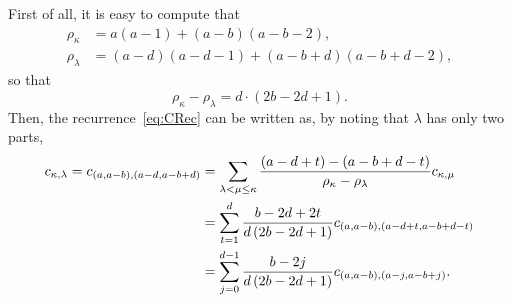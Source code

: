 \documentclass[10pt,oneside,american]{amsart}
\numberwithin{equation}{section}
\numberwithin{figure}{section}
\theoremstyle{plain}
\theoremstyle{definition}
\theoremstyle{remark}
\theoremstyle{plain}
\theoremstyle{definition}
\theoremstyle{plain}
\theoremstyle{plain}
\begin{document}
First of all, it is easy to compute that 
\begin{align*}
  \rho_{\kappa} &= a(a-1) + (a-b)(a-b-2), \\
  \rho_{\lambda} &= (a-d)(a-d-1) + (a-b+d)(a-b+d-2),
\end{align*}
so that
\[
  \rho_{\kappa}-\rho_{\lambda} = d\cdot(2b-2d+1).
\]
Then, the recurrence~\eqref{eq:CRec} can be written as, by noting that
$\lambda$ has only two parts,
\begin{align}\label{eq:rec2}
  c_{\kappa,\lambda} = c_{(a,a-b),(a-d,a-b+d)} &=
  \sum_{\lambda<\mu\leq\kappa}\frac{(a-d+t)-(a-b+d-t)}{\rho_{\kappa}-\rho_{\lambda}} c_{\kappa,\mu} \notag \\
  &= \sum_{t=1}^d\frac{b-2d+2t}{d\,(2b-2d+1)}c_{(a,a-b),(a-d+t,a-b+d-t)} \\
  &= \sum_{j=0}^{d-1} \frac{b-2j}{d\,(2b-2d+1)}c_{(a,a-b),(a-j,a-b+j)}. \notag
\end{align}
\end{document}
